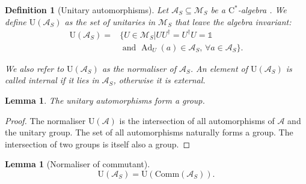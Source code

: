 \documentclass[11pt, twocolumn, floatfix, superscriptaddress, aps, prb, raggedbottom]{revtex4-2}
\newtheorem{lemma}[theorem]{Lemma}
\newtheorem{definition}{Definition}[section]
\newcommand{\comm}{\mathrm{Comm}}
\newcommand{\Id}{\mathds{1}}
\newcommand{\cstar}{$\mathrm{C}^*$-algebra }
\DeclareMathOperator{\Ad}{Ad}
\begin{document}
\begin{definition}[Unitary automorphisms]
    Let $\mathcal{A}_S \subseteq \mathcal{M}_S$ be a \cstar. 
    We define $\mathrm{U}(\mathcal{A}_S)$ as the set of unitaries in $\mathcal{M}_S$ that leave the algebra invariant:
    \begin{align*}
        \mathrm{U}(\mathcal{A}_S) = &\{U\in \mathcal{M}_S | UU^{\dagger} = U^{\dagger} U = \Id \\ &\text{ and } \Ad_U(a) \in \mathcal{A}_S \text{, } \forall a \in \mathcal{A}_S \}.
    \end{align*}

    \noindent We also refer to $\mathrm{U}(\mathcal{A}_S)$ as the normaliser of $\mathcal{A}_S$. An element of $\mathrm{U}(\mathcal{A}_S)$ is called internal if it lies in $\mathcal{A}_S$, otherwise it is external.
\end{definition}
\begin{lemma}
    The unitary automorphisms form a group.
\end{lemma}
\begin{proof}
    The normaliser $\mathrm{U}(\mathcal{A})$ is the intersection of all automorphisms of $\mathcal{A}$ and the unitary group.
    The set of all automorphisms naturally forms a group.
    The intersection of two groups is itself also a group.
\end{proof}
\begin{lemma}[Normaliser of commutant]
    \begin{equation}
      \mathrm{U}(\mathcal{A}_S) = \mathrm{U}(\comm(\mathcal{A}_S)).
    \end{equation}
\end{lemma}
\end{document}
